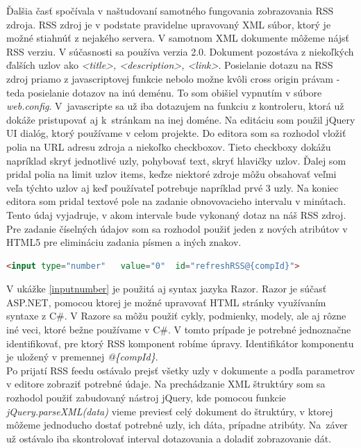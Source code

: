 \documentclass[11pt, oneside]{report}
\begin{document}
Ďalšia časť spočívala v naštudovaní samotného fungovania zobrazovania RSS zdroja. RSS zdroj je v podstate pravidelne upravovaný XML súbor, ktorý je možné stiahnúť z nejakého servera. V samotnom XML dokumente môžeme nájsť RSS verziu. V súčasnosti sa používa verzia 2.0. Dokument pozostáva z niekoľkých ďalších uzlov ako \textit{<title>, <description>, <link>}. Posielanie dotazu na RSS zdroj priamo z javascriptovej funkcie nebolo možne kvôli cross origin právam - teda posielanie  dotazov na inú deménu. To som obišiel vypnutím v súbore \textit{web.config}. V~javascripte sa už iba dotazujem na funkciu z kontroleru, ktorá  už dokáže pristupovať aj k~stránkam na inej doméne. Na editáciu som použil jQuery UI dialóg, ktorý používame v celom projekte. Do editora som sa rozhodol vložiť polia na URL adresu zdroja a niekoľko checkboxov. Tieto checkboxy dokážu napríklad skryť jednotlivé  uzly,  pohybovať text, skryť hlavičky uzlov. Ďalej som pridal polia na limit uzlov items, keďze niektoré zdroje môžu obsahovať veľmi veľa týchto uzlov aj keď používateľ potrebuje napríklad prvé 3 uzly. Na koniec editora som pridal textové pole na zadanie obnovovacieho intervalu v minútach. Tento údaj vyjadruje, v akom intervale bude vykonaný dotaz na náš RSS zdroj. Pre zadanie číselných údajov som sa rozhodol použiť jeden z nových atribútov  v HTML5 pre elimináciu zadania písmen a iných znakov.
\begin{lstlisting}[language=HTML,caption=Textové pole s číselným vstupom,captionpos=b,label=inputnumber]
				<input type="number"   value="0"  id="refreshRSS@{compId}">\end{lstlisting}
V ukážke \ref{inputnumber} je použitá aj syntax jazyka Razor. Razor je súčasť ASP.NET, pomocou ktorej je možné upravovať HTML stránky využívaním syntaxe z C\#. V Razore  sa môžu použiť cykly, podmienky, modely, ale aj rôzne iné veci, ktoré bežne používame v C\#. V tomto prípade je potrebné jednoznačne identifikovať, pre ktorý RSS komponent robíme úpravy. Identifikátor komponentu je uložený v premennej \textit{@\{compId\}}.\\
Po prijatí RSS feedu ostávalo prejsť všetky uzly v dokumente a podľa parametrov v editore  zobraziť potrebné údaje. Na prechádzanie  XML štruktúry som sa rozhodol použiť zabudovaný nástroj jQuery, kde pomocou funkcie \textit{jQuery.parseXML(data)} vieme previesť  celý dokument do štruktúry, v ktorej môžeme jednoducho  dostať potrebné uzly, ich dáta, prípadne atribúty. Na~záver už ostávalo iba skontrolovať interval dotazovania a doladiť zobrazovanie dát.\\
\end{document}
